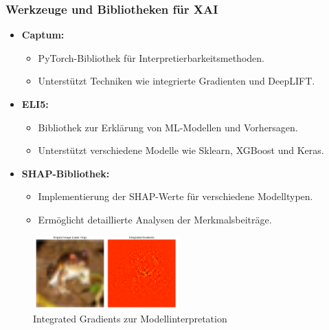 \documentclass[aspectratio=1610, xcolor=dvipsnames, 9pt]{beamer}
\begin{document}
\begin{frame}
  \frametitle{Werkzeuge und Bibliotheken für XAI}
  \begin{itemize}
      \item \textbf{Captum:}
      \begin{itemize}
          \item PyTorch-Bibliothek für Interpretierbarkeitsmethoden.
          \item Unterstützt Techniken wie integrierte Gradienten und DeepLIFT.
      \end{itemize}
      \item \textbf{ELI5:}
      \begin{itemize}
          \item Bibliothek zur Erklärung von ML-Modellen und Vorhersagen.
          \item Unterstützt verschiedene Modelle wie Sklearn, XGBoost und Keras.
      \end{itemize}
      \item \textbf{SHAP-Bibliothek:}
      \begin{itemize}
          \item Implementierung der SHAP-Werte für verschiedene Modelltypen.
          \item Ermöglicht detaillierte Analysen der Merkmalsbeiträge.
      \end{itemize}
  \end{itemize}
  \begin{figure}
      \centering
        \includegraphics[width=0.5\textwidth]{images/integrated_gradients.png}
        \caption{Integrated Gradients zur Modellinterpretation}
  \end{figure}
\end{frame}
\end{document}
